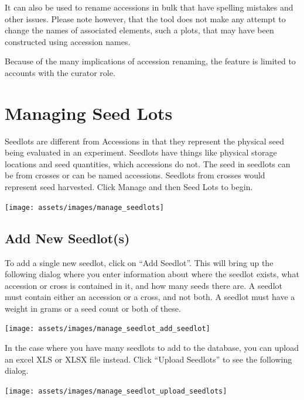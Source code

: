 \documentclass[
  12pt,
]{book}
\begin{document}
It can also be used to rename accessions in bulk that have spelling mistakes and other issues. Please note however, that the tool does not make any attempt to change the names of associated elements, such a plots, that may have been constructed using accession names.

Because of the many implications of accession renaming, the feature is limited to accounts with the curator role.

\hypertarget{managing-seed-lots}{%
\chapter{Managing Seed Lots}\label{managing-seed-lots}}

Seedlots are different from Accessions in that they represent the physical seed being evaluated in an experiment. Seedlots have things like physical storage locations and seed quantities, which accessions do not. The seed in seedlots can be from crosses or can be named accessions. Seedlots from crosses would represent seed harvested. Click Manage and then Seed Lots to begin.

\begin{center}\texttt{[image: assets/images/manage\_seedlots]} \end{center}

\hypertarget{add-new-seedlots}{%
\section{Add New Seedlot(s)}\label{add-new-seedlots}}

To add a single new seedlot, click on ``Add Seedlot''. This will bring up the following dialog where you enter information about where the seedlot exists, what accession or cross is contained in it, and how many seeds there are. A seedlot must contain either an accession or a cross, and not both. A seedlot must have a weight in grams or a seed count or both of these.

\begin{center}\texttt{[image: assets/images/manage\_seedlot\_add\_seedlot]} \end{center}

In the case where you have many seedlots to add to the database, you can upload an excel XLS or XLSX file instead. Click ``Upload Seedlots'' to see the following dialog.

\begin{center}\texttt{[image: assets/images/manage\_seedlot\_upload\_seedlots]} \end{center}
\end{document}
